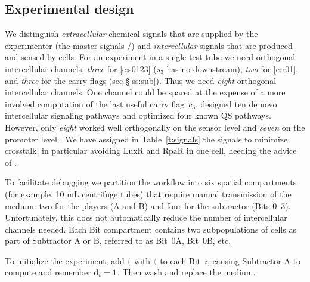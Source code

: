 \documentclass[12pt,notitlepage]{article}
\let\cite\citep
\newcommand{\cbra}[1]{{\ensuremath{\color{gray}{#1}}}}
\newcommand{\signal}[1]{{{\cbra{\langle}\ce{#1}\cbra{\rangle}}}}
\begin{document}












\subsection{Experimental design} \label{ss:experiment}

We distinguish
\emph{extracellular} chemical signals 
that are supplied by the experimenter
(the master signals /)
and
\emph{intercellular} signals
that are produced and sensed by cells.
%
%
%
For an experiment in a single test tube 
we need
orthogonal intercellular channels:
\emph{three} for \eqref{e:s0123}
($s_3$ has no downstream),
\emph{two} for \eqref{e:r01},
and
\emph{three} for the carry flags
(see \S\ref{ss:sub}).
%
Thus we need \emph{eight} orthogonal intercellular channels.
%
One channel could be spared 
at the expense
of a more involved computation of 
the last useful carry flag~$c_3$.
%
\citet{DuETAL2020}
designed
ten de novo intercellular signaling pathways
and
optimized
four known QS pathways.
%
However,
only \emph{eight} worked well orthogonally
on the sensor level 
and 
\emph{seven} on the promoter level
\cite[\href{https://www.nature.com/articles/s41467-020-17993-w/figures/3}{Fig.~3c/g}]{DuETAL2020}.
%
We have assigned in Table~\ref{t:signals}
the signals
to minimize crosstalk,
in particular 
avoiding LuxR and RpaR in one cell,
heeding the advice of \citet[p.6]{DuETAL2020}.
%
%




%


To facilitate debugging
we partition the workflow
into six 
spatial compartments
(for example, {10 mL centrifuge tubes})
that require manual transmission of 
the medium:
two for the players (A and B)
and
four for the subtractor (Bits 0--3).
%
%
Unfortunately, this does not automatically reduce
the number of intercellular channels needed.
%
Each Bit compartment
contains two subpopulations of cells 
as part of Subtractor A or B,
referred to as Bit~0A, Bit~0B, etc.

%

To initialize the experiment,
add 
\signal{w_B} with \signal{s_i}
to each Bit~$i$,
causing Subtractor A to compute and remember $\ce{d_i} = 1$.
%
Then wash and replace the medium.
\end{document}
